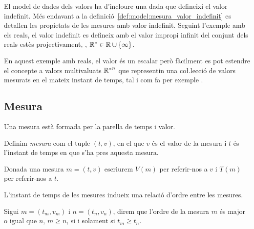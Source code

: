 

El model de dades dels valors ha d'incloure una dada que defineixi el
valor indefinit. Més endavant a la
definició~\ref{def:model:mesura_valor_indefinit} es detallen les
propietats de les mesures amb valor indefinit. Seguint l'exemple amb
els reals, el valor indefinit es defineix amb el valor impropi infinit
del conjunt dels reals estès
projectivament, \parencite{cantrell:projectivelyextendedreal},
$\mathbb{R}{}^*\in\mathbb{R}{} \cup \{\infty\}$.


En aquest exemple amb reals, el valor és un escalar però fàcilment es
pot estendre el concepte a valors multivaluats ${\mathbb{R}{}^*}^n$ que
representin una co\l.lecció de valors mesurats en el mateix instant de
temps, tal i com fa per exemple \textcite{assfalg08:thesis}.







\subsection{Mesura}\label{sec:model:mesura} 

Una mesura està formada per la parella de temps i valor.

\begin{definition}[Mesura]
  \label{def:model:mesura}
  Definim \emph{mesura} com el tuple $(t,v)$, en el que $v$ és el
  valor de la mesura i $t$ és l'instant de temps en que s'ha pres
  aquesta mesura.
\end{definition}


Donada una mesura $m=(t,v)$ escriurem $V(m)$ per referir-nos a $v$ i
$T(m)$ per referir-nos a $t$.

L'instant de temps de les mesures indueix una relació d'ordre entre
les mesures.
\begin{definition}
  \label{def:model:mesura-relacio-ordre}
  Sigui $m=(t_m,v_m)$ i $n=(t_n,v_n)$, direm que l'ordre de la mesura
  $m$ és major o igual que $n$, $m\geq n$, si i solament si $t_m\geq
  t_n$.
\end{definition}


